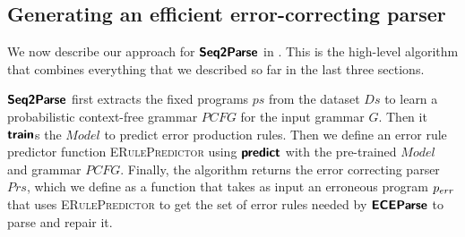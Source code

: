 \subsection{Generating an efficient error-correcting parser}
\label{sec:whole-system:building-ecp}



We now describe our approach for $\bm{\mathsf{Seq2Parse}}$ in . This
is the high-level algorithm that combines everything that we described so far in
the last three sections.

$\bm{\mathsf{Seq2Parse}}$ first extracts the fixed programs $ps$ from the dataset $Ds$ to
learn a probabilistic context-free grammar $PCFG$ for the input grammar $G$.
Then it $\bm{\mathsf{train}}$s the $Model$ to predict error production rules. Then we
define an error rule predictor function \textsc{ERulePredictor} using
$\bm{\mathsf{predict}}$ with the pre-trained $Model$ and grammar $PCFG$. Finally, the
algorithm returns the error correcting parser $Prs$, which we define as a
function that takes as input an erroneous program $p_{err}$ that uses
\textsc{ERulePredictor} to get the set of error rules needed by $\bm{\mathsf{ECEParse}}$ to
parse and repair it.
